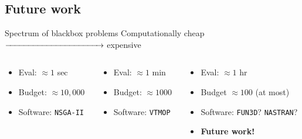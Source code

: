 \documentclass[xcolor=dvipsnames]{beamer}
\begin{document}
\subsection{Future work}
\begin{frame}{Spectrum of blackbox problems}
Computationally cheap $\xrightarrow{\hspace*{4cm}}$ expensive
\bigskip
\begin{columns}
\begin{column}{.33\textwidth}
\begin{itemize}
\item Eval: $\approx 1$ sec
\item Budget: $\approx 10,000$
\item Software: {\tt NSGA-II}
\end{itemize}
\end{column}
\begin{column}{.33\textwidth}
\begin{itemize}
\item Eval: $\approx 1$ min
\item Budget: $\approx 1000$
\item Software: {\tt VTMOP}
\end{itemize}
\end{column}
\begin{column}{.33\textwidth}
\begin{itemize}
\item Eval: $\approx 1$ hr
\item Budget $\approx 100$ (at most)
\item Software: {\tt FUN3D}? {\tt NASTRAN}?
\pause
\item {\bf Future work!}
\end{itemize}
\end{column}
\end{columns}
\end{frame}
\end{document}
